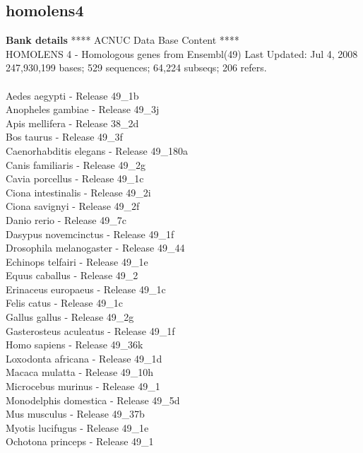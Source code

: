 \documentclass{article}
\begin{document}
\begin{Schunk}
\section{ homolens4 }
\textbf{Bank details}
             ****     ACNUC Data Base Content      ****\\
   HOMOLENS 4 - Homologous genes from Ensembl(49)	 Last Updated: Jul  4, 2008\\
247,930,199 bases; 529 sequences; 64,224 subseqs; 206 refers.\\
\\
 Aedes aegypti - Release 49\_1b \\
 Anopheles gambiae - Release 49\_3j \\
 Apis mellifera - Release 38\_2d \\
 Bos taurus - Release 49\_3f \\
 Caenorhabditis elegans - Release 49\_180a \\
 Canis familiaris - Release 49\_2g \\
 Cavia porcellus - Release 49\_1c \\
 Ciona intestinalis - Release 49\_2i \\
 Ciona savignyi - Release 49\_2f \\
 Danio rerio - Release 49\_7c \\
 Dasypus novemcinctus - Release 49\_1f \\
 Drosophila melanogaster - Release 49\_44 \\
 Echinops telfairi - Release 49\_1e \\
 Equus caballus - Release 49\_2 \\
 Erinaceus europaeus - Release 49\_1c \\
 Felis catus - Release 49\_1c \\
 Gallus gallus - Release 49\_2g \\
 Gasterosteus aculeatus - Release 49\_1f \\
 Homo sapiens - Release 49\_36k \\
 Loxodonta africana - Release 49\_1d \\
 Macaca mulatta - Release 49\_10h \\
 Microcebus murinus - Release 49\_1 \\
 Monodelphis domestica - Release 49\_5d \\
 Mus musculus - Release 49\_37b \\
 Myotis lucifugus - Release 49\_1e \\
 Ochotona princeps - Release 49\_1 \\

\end{Schunk}
\end{document}

